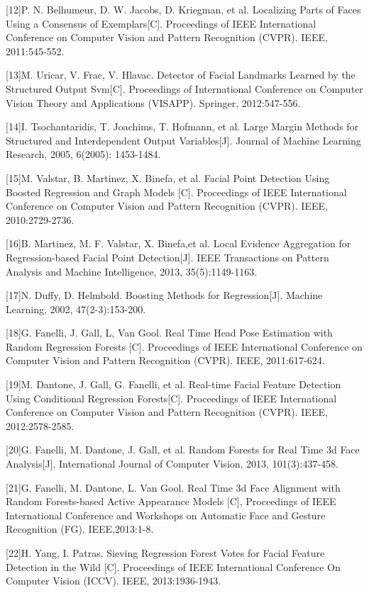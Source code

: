 \documentclass{article}
\begin{document}
{[12]P. N. Belhumeur, D. W. Jacobs, D. Kriegman, et al. Localizing Parts of Faces Using a Consensus of Exemplars[C]. Proceedings of IEEE International Conference on Computer Vision and Pattern Recognition (CVPR). IEEE, 2011:545-552.

[13]M. Uricar, V. Frac, V. Hlavac. Detector of Facial Landmarks Learned by the Structured Output Svm[C]. Proceedings of International Conference on Computer Vision Theory and Applications (VISAPP). Springer, 2012:547-556.

[14]I. Tsochantaridis, T. Joachims, T. Hofmann, et al. Large Margin Methods for Structured and Interdependent Output Variables[J]. Journal of Machine Learning Research, 2005, 6(2005): 1453-1484.

[15]M. Valstar, B. Martinez, X. Binefa, et al. Facial Point Detection Using Boosted Regression and Graph Models [C]. Proceedings of IEEE International Conference on Computer Vision and Pattern Recognition (CVPR). IEEE, 2010:2729-2736.

[16]B. Martinez, M. F. Valstar, X. Binefa,et al. Local Evidence Aggregation for Regression-based Facial Point Detection[J]. IEEE Transactions on Pattern Analysis and Machine Intelligence, 2013, 35(5):1149-1163.

[17]N. Duffy, D. Helmbold. Boosting Methods for Regression[J]. Machine Learning, 2002, 47(2-3):153-200.

[18]G. Fanelli, J. Gall, L, Van Gool. Real Time Head Pose Estimation with Random Regression Forests [C]. Proceedings of IEEE International Conference on Computer Vision and Pattern Recognition (CVPR). IEEE, 2011:617-624.

[19]M. Dantone, J. Gall, G. Fanelli, et al. Real-time Facial Feature Detection Using Conditional Regression Forests[C]. Proceedings of IEEE International Conference on Computer Vision and Pattern Recognition (CVPR). IEEE, 2012:2578-2585.

[20]G. Fanelli, M. Dantone, J. Gall, et al. Random Forests for Real Time 3d Face Analysis[J]. International Journal of Computer Vision, 2013, 101(3):437-458.

[21]G. Fanelli, M. Dantone, L. Van Gool. Real Time 3d Face Alignment with Random Forests-based Active Appearance Models [C], Proceedings of IEEE International Conference and Workshops on Automatic Face and Gesture Recognition (FG). IEEE,2013:1-8.

[22]H. Yang, I. Patras. Sieving Regression Forest Votes for Facial Feature Detection in the Wild [C]. Proceedings of IEEE International Conference On Computer Vision (ICCV). IEEE, 2013:1936-1943.

}
\end{document}
